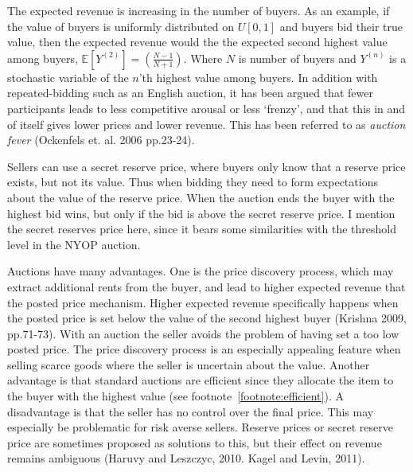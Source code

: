 \documentclass[a4paper,12pt]{article}
\begin{document}
	The expected revenue is increasing in the number of buyers. As an example, if the value of buyers is uniformly distributed on $U[0,1]$ and buyers bid their true value, then the expected revenue would the the expected second highest value among buyers, $\mathbb{E}[Y^{(2)}] = (\frac{N-1}{N+1})$. Where $N$ is number of buyers and $Y^{(n)}$ is a stochastic variable of the $n$'th highest value among buyers. In addition with repeated-bidding such as an English auction, it has been argued that fewer participants leads to less competitive arousal or less `frenzy', and that this in and of itself gives lower prices and lower revenue. This has been referred to as \emph{auction fever} (Ockenfels et. al. 2006 pp.23-24). 

	Sellers can use a secret reserve price, where buyers only know that a reserve price exists, but not its value. Thus when bidding they need to form expectations about the value of the reserve price. When the auction ends the buyer with the highest bid wins, but only if the bid is above the secret reserve price. I mention the secret reserves price here, since it bears some similarities with the threshold level in the NYOP auction.

	Auctions have many advantages. One is the price discovery process, which may extract additional rents from the buyer, and lead to higher expected revenue that the posted price mechanism. Higher expected revenue specifically happens when the posted price is set below the value of the second highest buyer (Krishna 2009, pp.71-73). With an auction the seller avoids the problem of having set a too low posted price. The price discovery process is an especially appealing feature when selling scarce goods where the seller is uncertain about the value. Another advantage is that standard auctions are efficient since they allocate the item to the buyer with the highest value (see footnote~\ref{footnote:efficient}). A disadvantage is that the seller has no control over the final price. This may especially be problematic for risk averse sellers. Reserve prices or secret reserve price are sometimes proposed as solutions to this, but their effect on revenue remains ambiguous (Haruvy and Leszczyc, 2010. Kagel and Levin, 2011).
\end{document}
